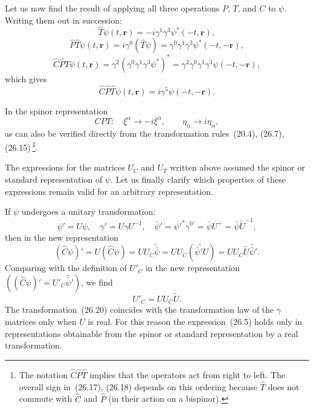 Let us now find the result of applying all three operations $P$, $T$, and $C$ to $\psi$. Writing them out in succession:
\[
\widehat T\psi(t,\mathbf{r}) = -i\gamma^1\gamma^3\psi^*(-t,\mathbf{r}),
\]
\[
\widehat P\widehat T\psi(t,\mathbf{r}) = i\gamma^0(\widehat T\psi) = \gamma^0\gamma^1\gamma^3\psi^*(-t,-\mathbf{r}),
\]
\[
\widehat C\widehat P\widehat T\psi(t,\mathbf{r}) = \gamma^2(\gamma^0\gamma^1\gamma^3\psi^*)^* = \gamma^2\gamma^0\gamma^1\gamma^3\psi(-t,-\mathbf{r}),
\]
which gives
\begin{equation}
\widehat C\widehat P\widehat T\psi(t,\mathbf{r}) = i\gamma^5\psi(-t,-\mathbf{r}).
\tag{26.17}
\end{equation}

In the spinor representation
\begin{equation}
CPT:\quad \xi^\alpha \to -i\xi^\alpha,\qquad \eta_{\dot\alpha} \to i\eta_{\dot\alpha},
\tag{26.18}
\end{equation}
as can also be verified directly from the transformation rules~(20.4), (26.7), (26.15)\,\footnote{The notation $\widehat C\widehat P\widehat T$ implies that the operators act from right to left. The overall sign in~(26.17), (26.18) depends on this ordering because $\widehat T$ does not commute with $\widehat C$ and $\widehat P$ (in their action on a bispinor).}.

The expressions for the matrices $U_C$ and $U_T$ written above assumed the spinor or standard representation of $\psi$. Let us finally clarify which properties of these expressions remain valid for an arbitrary representation.

If $\psi$ undergoes a unitary transformation:
\begin{equation}
\psi' = U\psi,\quad \gamma' = U\gamma U^{-1},\quad \bar\psi' = \psi'^*\gamma^{0\prime} = \bar\psi U^+ = \bar\psi\widetilde U^{-1},
\tag{26.19}
\end{equation}
then in the new representation
\[
(\widehat C\psi)' = U(\widehat C\psi) = UU_C\widetilde{\bar\psi} = UU_C(\widetilde{\bar\psi'U}) = UU_C\widetilde U\widetilde{\bar\psi'}.
\]
Comparing with the definition of $U'_C$ in the new representation $((\widehat C\psi)' = U'_C\widetilde{\bar\psi'})$, we find
\begin{equation}
U'_C = UU_C\widetilde U.
\tag{26.20}
\end{equation}
The transformation~(26.20) coincides with the transformation law of the $\gamma$ matrices only when $U$ is real. For this reason the expression~(26.5) holds only in representations obtainable from the spinor or standard representation by a real transformation.

